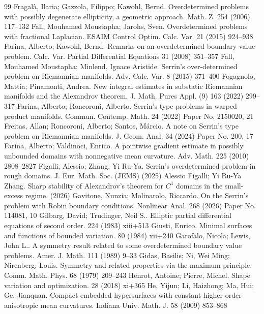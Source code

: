 \documentclass[10pt,a4paper]{amsart}
\numberwithin{equation}{section}
\begin{document}
\begin{thebibliography}{99}
 Fragal\`a, Ilaria; Gazzola, Filippo; Kawohl, Bernd. Overdetermined problems with possibly degenerate ellipticity, a geometric approach. Math. Z. 254 (2006) 117--132
 Fall, Mouhamed Moustapha; Jarohs, Sven. Overdetermined problems with fractional {L}aplacian. ESAIM Control Optim. Calc. Var. 21 (2015) 924--938
 Farina, Alberto; Kawohl, Bernd. Remarks on an overdetermined boundary value problem. Calc. Var. Partial Differential Equations 31 (2008) 351--357
 Fall, Mouhamed Moustapha; Minlend, Ignace Aristide. Serrin's over-determined problem on {R}iemannian manifolds. Adv. Calc. Var. 8 (2015) 371--400
 Fogagnolo, Mattia; Pinamonti, Andrea. New integral estimates in substatic {R}iemannian manifolds and the {A}lexandrov theorem. J. Math. Pures Appl. (9) 163 (2022) 299--317
 Farina, Alberto; Roncoroni, Alberto. Serrin's type problems in warped product manifolds. Commun. Contemp. Math. 24 (2022) Paper No. 2150020, 21
 Freitas, Allan; Roncoroni, Alberto; Santos, M\'arcio. A note on {S}errin's type problem on {R}iemannian manifolds. J. Geom. Anal. 34 (2024) Paper No. 200, 17
 Farina, Alberto; Valdinoci, Enrico. A pointwise gradient estimate in possibly unbounded domains with nonnegative mean curvature. Adv. Math. 225 (2010) 2808--2827
 Figalli, Alessio; Zhang, Yi Ru-Ya. Serrin’s overdetermined problem in rough domains. J. Eur. Math. Soc. (JEMS) (2025)
 Alessio Figalli; Yi Ru-Ya Zhang. Sharp stability of Alexandrov's theorem for $C^1$ domains in the small-excess regime. (2026)
 Gavitone, Nunzia; Molinarolo, Riccardo. On the {S}errin's problem with {R}obin boundary conditions. Nonlinear Anal. 268 (2026) Paper No. 114081, 10
 Gilbarg, David; Trudinger, Neil S.. Elliptic partial differential equations of second order. 224 (1983) xiii+513
 Giusti, Enrico. Minimal surfaces and functions of bounded variation. 80 (1984) xii+240
 Garofalo, Nicola; Lewis, John L.. A symmetry result related to some overdetermined boundary value problems. Amer. J. Math. 111 (1989) 9--33
 Gidas, Basilis; Ni, Wei Ming; Nirenberg, Louis. Symmetry and related properties via the maximum principle. Comm. Math. Phys. 68 (1979) 209--243
 Henrot, Antoine; Pierre, Michel. Shape variation and optimization. 28 (2018) xi+365
 He, Yijun; Li, Haizhong; Ma, Hui; Ge, Jianquan. Compact embedded hypersurfaces with constant higher order anisotropic mean curvatures. Indiana Univ. Math. J. 58 (2009) 853--868

\end{thebibliography}
\end{document}
